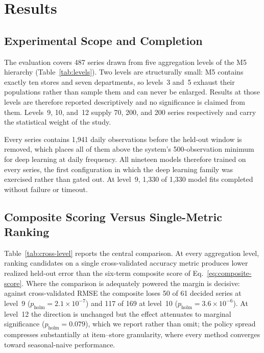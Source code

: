 \section{Results}
\label{sec:results}

\subsection{Experimental Scope and Completion}
The evaluation covers 487 series drawn from five aggregation levels of the M5 hierarchy (Table~\ref{tab:levels}). Two levels are structurally small: M5 contains exactly ten stores and seven departments, so levels~3 and~5 exhaust their populations rather than sample them and can never be enlarged. Results at those levels are therefore reported descriptively and no significance is claimed from them. Levels~9, 10, and~12 supply 70, 200, and 200 series respectively and carry the statistical weight of the study.



Every series contains 1{,}941 daily observations before the held-out window is removed, which places all of them above the system's 500-observation minimum for deep learning at daily frequency. All nineteen models therefore trained on every series, the first configuration in which the deep learning family was exercised rather than gated out. At level~9, 1{,}330 of 1{,}330 model fits completed without failure or timeout.

\subsection{Composite Scoring Versus Single-Metric Ranking}
Table~\ref{tab:cross-level} reports the central comparison. At every aggregation level, ranking candidates on a single cross-validated accuracy metric produces lower realized held-out error than the six-term composite score of Eq.~\eqref{eq:composite-score}. Where the comparison is adequately powered the margin is decisive: against cross-validated RMSE the composite loses 50 of 61 decided series at level~9 ($p_{\text{holm}}=2.1\times10^{-7}$) and 117 of 169 at level~10 ($p_{\text{holm}}=3.6\times10^{-6}$). At level~12 the direction is unchanged but the effect attenuates to marginal significance ($p_{\text{holm}}=0.079$), which we report rather than omit; the policy spread compresses substantially at item--store granularity, where every method converges toward seasonal-naive performance.



